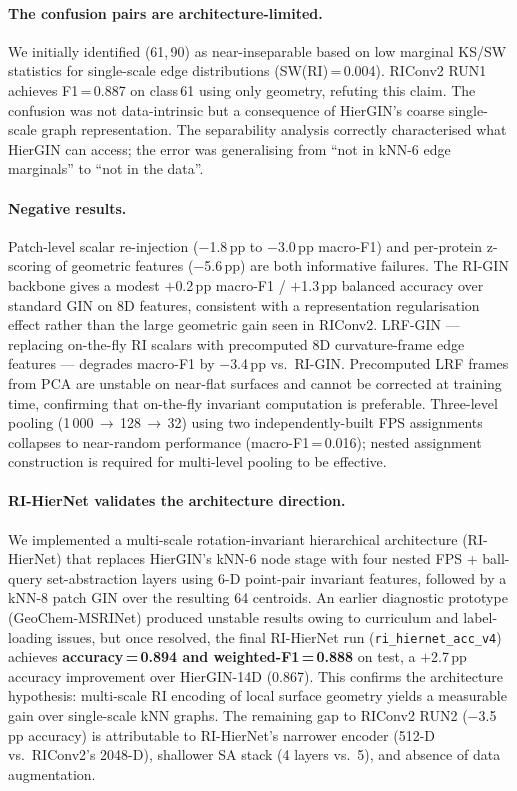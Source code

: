 \paragraph{The confusion pairs are architecture-limited.}
We initially identified (61,\,90) as near-inseparable based on low marginal
KS/SW statistics for single-scale edge distributions (SW(RI)\,=\,0.004).
RIConv2 RUN1 achieves F1\,=\,0.887 on class\,61 using only geometry,
refuting this claim.
The confusion was not data-intrinsic but a consequence of HierGIN's
coarse single-scale graph representation.
The separability analysis correctly characterised what HierGIN can access;
the error was generalising from ``not in kNN-6 edge marginals'' to
``not in the data''.

\paragraph{Negative results.}
Patch-level scalar re-injection ($-$1.8\,pp to $-$3.0\,pp macro-F1) and
per-protein z-scoring of geometric features ($-$5.6\,pp) are both informative
failures.
The RI-GIN backbone gives a modest $+$0.2\,pp macro-F1 / $+$1.3\,pp balanced
accuracy over standard GIN on 8D features, consistent with a representation
regularisation effect rather than the large geometric gain seen in RIConv2.
LRF-GIN --- replacing on-the-fly RI scalars with precomputed 8D curvature-frame
edge features --- degrades macro-F1 by $-$3.4\,pp vs.\ RI-GIN.
Precomputed LRF frames from PCA are unstable on near-flat surfaces and cannot be
corrected at training time, confirming that on-the-fly invariant computation is preferable.
Three-level pooling (1\,000\,$\to$\,128\,$\to$\,32) using two independently-built
FPS assignments collapses to near-random performance (macro-F1\,=\,0.016);
nested assignment construction is required for multi-level pooling to be effective.

\paragraph{RI-HierNet validates the architecture direction.}
We implemented a multi-scale rotation-invariant hierarchical architecture
(RI-HierNet) that replaces HierGIN's kNN-6 node stage with four nested FPS +
ball-query set-abstraction layers using 6-D point-pair invariant features,
followed by a kNN-8 patch GIN over the resulting 64 centroids.
An earlier diagnostic prototype (GeoChem-MSRINet) produced unstable results
owing to curriculum and label-loading issues, but once resolved, the final
RI-HierNet run (\texttt{ri\_hiernet\_acc\_v4}) achieves
\textbf{accuracy\,=\,0.894 and weighted-F1\,=\,0.888} on test,
a $+$2.7\,pp accuracy improvement over HierGIN-14D (0.867).
This confirms the architecture hypothesis: multi-scale RI encoding of local
surface geometry yields a measurable gain over single-scale kNN graphs.
The remaining gap to RIConv2 RUN2 ($-$3.5\,pp accuracy) is attributable to
RI-HierNet's narrower encoder (512-D vs.\ RIConv2's 2048-D), shallower SA
stack (4 layers vs.\ 5), and absence of data augmentation.

